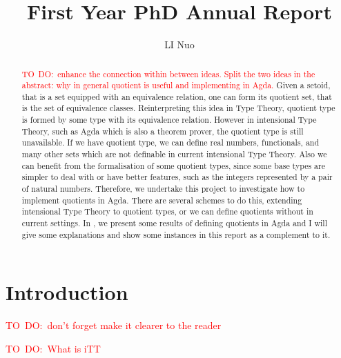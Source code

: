 \documentclass[envcountsame]{llncs}
\author{LI Nuo}
\title{First Year PhD Annual Report}
\institute{University of Nottingham}
\newcommand{\todo}[1]{\textcolor{red}{TO~DO:~#1}}
\newcommand{\itt}{intensional Type Theory}
\begin{document}
\maketitle

\newpage
\tableofcontents

\newpage
\begin{abstract}
\todo{enhance the connection within between ideas. Split the two ideas in the abstract: why in general quotient is useful and implementing in Agda.}
Given a setoid, that is a set equipped with an equivalence relation, one can form its quotient set, that is the set of equivalence classes. %
Reinterpreting this idea in Type Theory, quotient type is formed by some type with its equivalence relation. However in \itt, such as Agda which is also a theorem prover, the quotient type is still unavailable. If we have quotient type, we can define real numbers, functionals, and many other sets which are not definable in current \itt. Also we can benefit from the formalisation of some quotient types, since some base types are simpler to deal with or have better features, such as the integers represented by a pair of natural numbers.  Therefore, we undertake this project to investigate how to implement quotients in Agda. There are several schemes to do this, extending intensional Type Theory to quotient types, or we can define quotients without in current settings. In  \cite{aan}, we present some results of defining quotients in Agda and I will
give some explanations  and show some instances in this report as a complement to it.

\end{abstract}


\section{Introduction}

\todo{don't forget make it clearer to the reader}

\todo{What is iTT}
\end{document}
